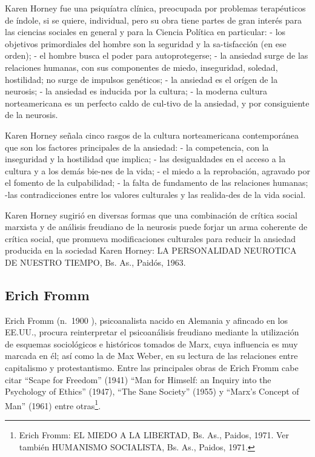 \documentclass[
]{book}
\begin{document}
Karen Horney fue una psiquíatra clínica, preocupada por problemas terapéuticos de índole, si se quiere, individual, pero su obra tiene partes de gran interés para las ciencias sociales en general y para la Ciencia Política en particular: - los objetivos primordiales del hombre son la seguridad y la sa-tisfacción (en ese orden); - el hombre busca el poder para autoprotegerse; - la ansiedad surge de las relaciones humanas, con sus componentes de miedo, inseguridad, soledad, hostilidad; no surge de impulsos genéticos; - la ansiedad es el orígen de la neurosis; - la ansiedad es inducida por la cultura; - la moderna cultura norteamericana es un perfecto caldo de cul-tivo de la ansiedad, y por consiguiente de la neurosis.

Karen Horney señala cinco rasgos de la cultura norteamericana contemporánea que son los factores principales de la ansiedad: - la competencia, con la inseguridad y la hostilidad que implica; - las desigualdades en el acceso a la cultura y a los demás bie-nes de la vida; - el miedo a la reprobación, agravado por el fomento de la culpabilidad; - la falta de fundamento de las relaciones humanas; -las contradicciones entre los valores culturales y las realida-des de la vida social.

Karen Horney sugirió en diversas formas que una combinación de crítica social marxista y de análisis freudiano de la neurosis puede forjar un arma coherente de crítica social, que promueva modificaciones culturales para reducir la ansiedad producida en la sociedad Karen Horney: LA PERSONALIDAD NEUROTICA DE NUESTRO TIEMPO, Bs. As., Paidós, 1963.

\hypertarget{erich-fromm}{%
\subsection*{Erich Fromm}\label{erich-fromm}}

Erich Fromm (n.~1900 ), psicoanalista nacido en Alemania y afincado en los EE.UU., procura reinterpretar el psicoanálisis freudiano mediante la utilización de esquemas sociológicos e históricos tomados de Marx, cuya influencia es muy marcada en él; así como la de Max Weber, en su lectura de las relaciones entre capitalismo y protestantismo. Entre las principales obras de Erich Fromm cabe citar ``Scape for Freedom'' (1941) ``Man for Himself: an Inquiry into the Psychology of Ethics'' (1947), ``The Sane Society'' (1955) y ``Marx's Concept of Man'' (1961) entre otras\footnote{Erich Fromm: EL MIEDO A LA LIBERTAD, Bs. As., Paidos, 1971. Ver también HUMANISMO SOCIALISTA, Bs. As., Paidos, 1971.}.
\end{document}
